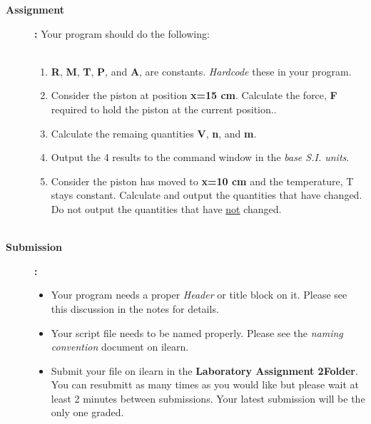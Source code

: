\documentclass[11pt]{article}
\newcommand{\NUM}{2}
\begin{document}
\begin{description}
       
        \item [\textbf{ \Large Assignment}] \textbf{ \Large :}
            Your program should do the following:\\\\
            \begin{enumerate}
            \item
            {\bf R}, {\bf M}, {\bf T}, {\bf P}, and {\bf A}, are constants. {\it Hardcode} these in your program. \\
            \item
            Consider the piston at position  {\bf x=15 cm}. Calculate the force, {\bf F} required to hold the piston at the current position..\\	
            \item
            Calculate the remaing quantities {\bf V}, {\bf n}, and {\bf m}.\\ 
            \item
            Output the 4 results to the command window in the {\it base S.I. units}. \\
            \item
            Consider the piston has moved to {\bf x=10 cm} and the temperature, T stays constant. Calculate and output the quantities that have changed. Do not output the quantities that have \underline{not} changed.\\\\  
             
        	\end{enumerate}

\item [\textbf{Submission }]\textbf{:} \\
			\begin{itemize}
				\item Your program needs a proper {\it Header} or title block on it. Please see this discussion in the notes for details.\\
				\item Your script file needs to be named properly. Please see the {\it naming convention} document on ilearn. \\
				\item Submit your file on ilearn in the {\bf Laboratory Assignment \NUM \hspace{2mm}Folder}. You can resubmitt as many times as you would like but please wait at least 2 minutes between submissions. Your latest submission will be the only one graded.

			\end{itemize}


	\end{description}
 
\end{document}
